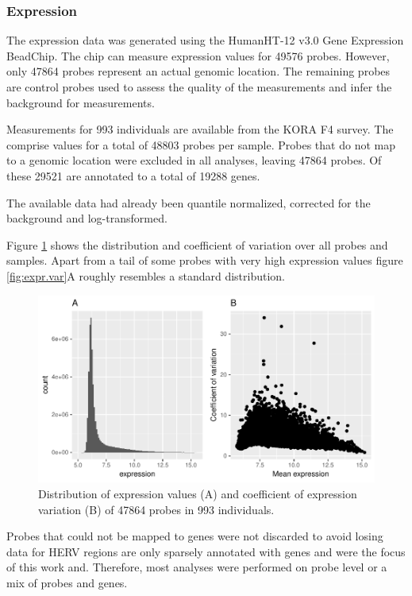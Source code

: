 \documentclass[a4paper,12pt]{article}
\begin{document}
\subsubsection{Expression}
The expression data was generated using the HumanHT-12 v3.0 Gene Expression BeadChip. The chip can measure expression values for 49576 probes. However, only 47864 probes represent an actual genomic location. The remaining probes are control probes used to assess the quality of the measurements and infer the background for measurements. 

Measurements for 993 individuals are available from the KORA F4 survey. The comprise values for a total of 48803 probes per sample. Probes that do not map to a genomic location were excluded in all analyses, leaving 47864 probes. Of these 29521 are annotated to a total of 19288 genes. 

The available data had already been quantile normalized, corrected for the background and log-transformed. 

Figure \ref{fig:expr.raw.hist.cov} shows the distribution and coefficient of variation over all probes and samples. Apart from a tail of some probes with very high expression values figure \ref{fig:expr.var}A roughly resembles a standard distribution. 

\begin{figure}[tb]
	\includegraphics[scale = 1, keepaspectratio = true]{../figures/expr_raw_hist_cov}  
	\caption{Distribution of expression values (A) and coefficient of expression variation (B) of 47864 probes in 993 individuals.}
    \label{fig:expr.raw.hist.cov}
\end{figure}


Probes that could not be mapped to genes were not discarded to avoid losing data for HERV regions are only sparsely annotated with genes and were the focus of this work and. Therefore, most analyses were performed on probe level or a mix of probes and genes.
\end{document}
